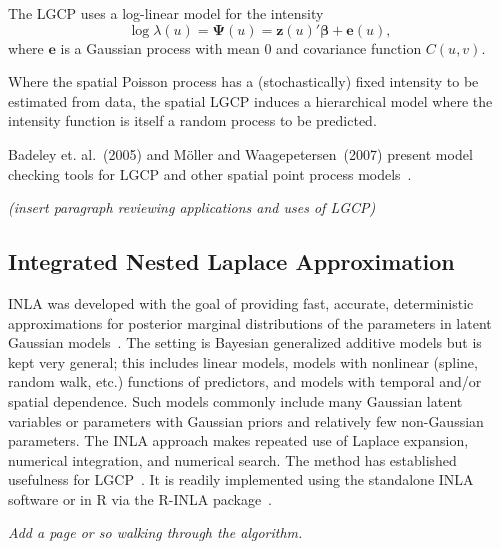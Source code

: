 \documentclass[]{interact}
\begin{document}
The LGCP uses a log-linear model for the intensity
\begin{displaymath}
\log\lambda(u) = \boldsymbol{\Psi}(u)
= \mathbf{z}(u)' \boldsymbol{\beta} + \mathbf{e}(u),
\end{displaymath}
where \(\mathbf{e}\) is a Gaussian process with mean 0 and covariance function
\(C(u, v)\).

Where the spatial Poisson process has a (stochastically) fixed intensity to be
estimated from data, the spatial LGCP induces a hierarchical model where the
intensity function is itself a random process to be predicted.

Badeley et. al.~(2005) and M\"{o}ller and Waagepetersen~(2007) present model
checking tools for LGCP and other spatial point process
models~\cite{baddeleyresiduals,moellerwaagepetersen}.

{\it (insert paragraph reviewing applications and uses of LGCP)}


\subsection{Integrated Nested Laplace Approximation}
\label{inla}

INLA was developed with the goal of providing fast, accurate, deterministic
approximations for posterior marginal distributions of the parameters in
latent Gaussian models~\cite{rueetal}. The setting is Bayesian generalized
additive models but is kept very general; this includes linear models, models
with nonlinear (spline, random walk, etc.) functions of predictors, and models
with temporal and/or spatial dependence. Such models commonly include many
Gaussian latent variables or parameters with Gaussian priors and relatively
few non-Gaussian parameters. The INLA approach makes repeated use of Laplace
expansion, numerical integration, and numerical search. The method has
established usefulness for LGCP~\cite{illianetal}. It is readily implemented
using the standalone INLA software or in R via the R-INLA
package~\cite{inlar}.

{\it Add a page or so walking through the algorithm.}




\end{document}
